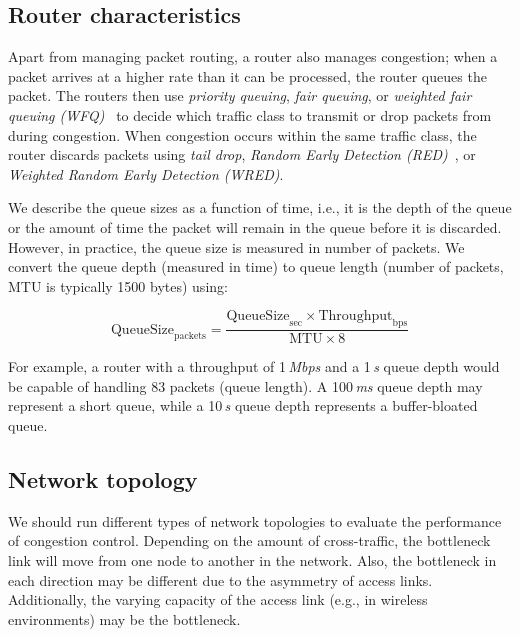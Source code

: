 \subsection{Router characteristics}


Apart from managing packet routing, a router also manages congestion; when a
packet arrives at a higher rate than it can be processed, the router queues the
packet. The routers then use \emph{priority queuing}, \emph{fair queuing}, or
\emph{weighted fair queuing (WFQ)}~\cite{rfc4594} to decide which traffic
class to transmit or drop packets from during congestion. When congestion
occurs within the same traffic class, the router discards packets using
\emph{tail drop}, \emph{Random Early Detection (RED)}~\cite{Floyd:RED}, or
\emph{Weighted Random Early Detection (WRED)}.

We describe the queue sizes as a function of time, i.e., it is the depth of
the queue or the amount of time the packet will remain in the queue before it
is discarded. However, in practice, the queue size is measured in number of
packets. We convert the queue depth (measured in time) to queue length (number
of packets, MTU is typically 1500 bytes) using:

\begin{equation*}
  \mathrm{QueueSize}_\mathrm{packets} = 
    \frac{\mathrm{QueueSize}_\mathrm{sec} \times
    \mathrm{Throughput}_\mathrm{bps}}{\mathrm{MTU} \times \mathrm{8}}
\end{equation*}

For example, a router with a throughput of 1\,\emph{Mbps} and a 1\,\emph{s} queue depth would be
capable of handling 83 packets (queue length). A 100\,\emph{ms}
queue depth may represent a short queue, while a 10\,\emph{s} queue depth represents
a buffer-bloated queue.

\subsection{Network topology}

We should run different types of network topologies to evaluate the
performance of congestion control. Depending on the amount of cross-traffic,
the bottleneck link will move from one node to another in the network. Also,
the bottleneck in each direction may be different due to the asymmetry of
access links. Additionally, the varying capacity of the access link (e.g., in
wireless environments) may be the bottleneck.


